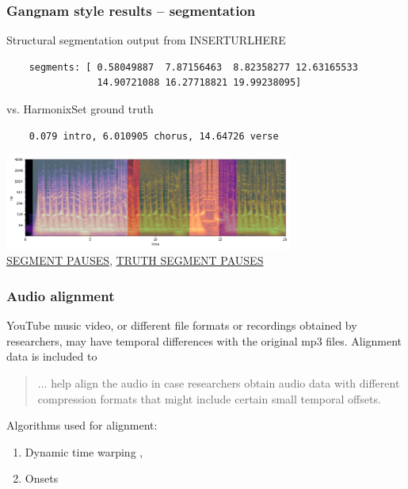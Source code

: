 \documentclass{beamer}
\begin{document}

\begin{frame}[fragile]
	\frametitle{Gangnam style results -- segmentation}
	Structural segmentation output from INSERTURLHERE
	\begin{verbatim}
	segments: [ 0.58049887  7.87156463  8.82358277 12.63165533
	      	    14.90721088 16.27718821 19.99238095]
	\end{verbatim}
	vs. HarmonixSet ground truth
	\begin{verbatim}
	0.079 intro, 6.010905 chorus, 14.64726 verse
	\end{verbatim}
	\includegraphics[width=9.5cm]{./laplacian_segments.png}\\
	\href{run:./gangnam_segments.wav}{SEGMENT PAUSES}, \href{run:./gangnam_segments_truth.wav}{TRUTH SEGMENT PAUSES}
\end{frame}

\begin{frame}
	\frametitle{Audio alignment}
	YouTube music video, or different file formats or recordings obtained by researchers, may have temporal differences with the original mp3 files. Alignment data is included to
	\begin{quote}
	... help align the audio in case researchers obtain audio data with different compression formats that might include certain small temporal offsets.
	\end{quote}
	Algorithms used for alignment:
	\begin{enumerate}
		\item
			Dynamic time warping , 
		\item
			Onsets 
	\end{enumerate}
\end{frame}

\end{document}
